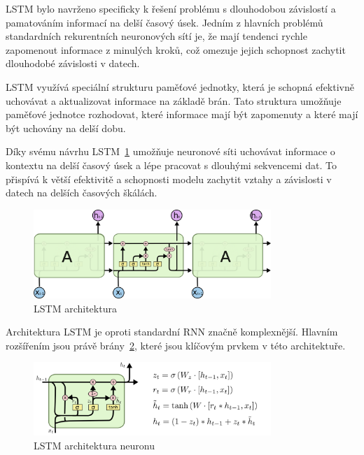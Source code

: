 LSTM bylo navrženo specificky k řešení problému s dlouhodobou závislostí a pamatováním informací na delší časový úsek.
Jedním z hlavních problémů standardních rekurentních neuronových sítí je, že mají tendenci rychle zapomenout informace z minulých kroků, což omezuje jejich schopnost zachytit dlouhodobé závislosti v datech.

LSTM využívá speciální strukturu paměťové jednotky, která je schopná efektivně uchovávat a aktualizovat informace na základě brán.
Tato struktura umožňuje paměťové jednotce rozhodovat, které informace mají být zapomenuty a které mají být uchovány na delší dobu.

Díky svému návrhu LSTM~\ref{fig:LSTM architektura} umožňuje neuronové síti uchovávat informace o kontextu na delší časový úsek a lépe pracovat s dlouhými sekvencemi dat.
To přispívá k větší efektivitě a schopnosti modelu zachytit vztahy a závislosti v datech na delších časových škálách.

\begin{figure}[H]
	\centering
	\includegraphics[width=0.8\textwidth]{Figures/LSTM_architecture.png}
	\caption{LSTM architektura~\cite{link3}}\label{fig:LSTM architektura}
\end{figure}

Architektura LSTM je oproti standardní RNN značně komplexnější.
Hlavním rozšířením jsou právě brány~\ref{fig:LSTM architektura neuronu}, které jsou klíčovým prvkem v této architektuře.

\begin{figure}[H]
	\centering
	\includegraphics[width=0.8\textwidth]{Figures/LSTM_architecture_neuron.png}
	\caption{LSTM architektura neuronu~\cite{link3}}\label{fig:LSTM architektura neuronu}
\end{figure}

